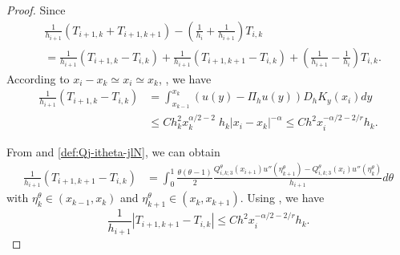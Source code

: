 \documentclass{amsart}
\theoremstyle{definition}
\theoremstyle{remark}
\numberwithin{equation}{section}
\begin{document}
\begin{proof}
Since
\begin{equation} \label{eq:I24-depart}
  \begin{aligned}
     & \frac{1}{h_{i+1}} \left(T_{i+1, k} +  T_{i+1, k+1}\right)
    - \left(\frac{1}{h_{i}}+\frac{1}{h_{i+1}}\right) T_{i,k}   \\
     & = \frac{1}{h_{i+1}} \left(T_{i+1, k} -  T_{i, k}\right) + \frac{1}{h_{i+1}} \left(T_{i+1, k+1} -  T_{i, k}\right) + \left(\frac{1}{h_{i+1}} - \frac{1}{h_{i}}\right) T_{i,k} .
  \end{aligned}
\end{equation}
According to \(x_i - x_k \simeq x_i \simeq x_k\), , we have
\begin{equation*}
  \begin{aligned}
    \frac{1}{h_{i+1}} (T_{i+1, k} -  T_{i, k})
     & = \int_{x_{k-1}}^{x_k} (u(y)-\Pi_hu(y)) D_h K_y (x_i) dy \\
     & \le C  h_k^2 x_{k}^{\alpha/2-2} \; h_k|x_i-x_{k}|^{-\alpha}
     \le C  h^2 x_i^{-\alpha/2-2/r} h_k .
  \end{aligned}
\end{equation*}

From  and \eqref{def:Qj-itheta-jlN}, %
we can obtain
\begin{equation*}
  \begin{aligned}
    \frac{1}{h_{i+1}} \left(T_{i+1, k+1} -  T_{i, k}\right) %
     & = \int_{0}^{1} \frac{\theta(\theta-1)}{2} \frac{Q_{i,k;3}^\theta(x_{i+1})u''(\eta_{k+1}^\theta) - Q_{i,k;3}^\theta(x_i) u''(\eta_{k}^\theta)}{h_{i+1}} d\theta 
  \end{aligned}
\end{equation*}
with \(\eta_{k}^\theta \in (x_{k-1}, x_k)\) and \(\eta_{k+1}^\theta \in (x_k, x_{k+1})\).
Using , we have
\begin{equation*}
  \frac{1}{h_{i+1}} |T_{i+1, k+1} -  T_{i, k}| \le C h^2 x_i^{-\alpha/2-2/r} h_k.
\end{equation*}


\end{proof}
\end{document}
